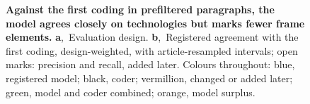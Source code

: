 \begin{figure}[htbp]
\begin{tabular}{@{}l@{}}
\end{tabular}
\caption[Evaluation design and headline result]{\textbf{Against the first coding in prefiltered paragraphs, the model agrees closely on technologies but marks fewer frame elements.} \textbf{a},~Evaluation design. \textbf{b},~Registered agreement with the first coding, design-weighted, with article-resampled intervals; open marks: precision and recall, added later. Colours throughout: blue, registered model; black, coder; vermillion, changed or added later; green, model and coder combined; orange, model surplus.}
\label{fig:overview}
\end{figure}
